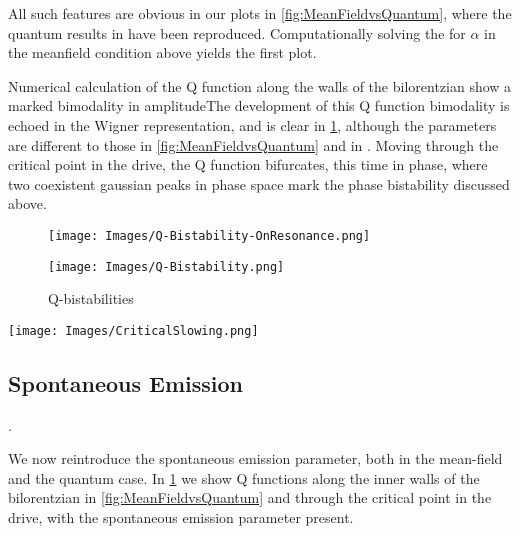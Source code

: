 All such features are obvious in our plots in \cref{fig:MeanFieldvsQuantum}, where the quantum results in \cite{Carmichael2015} have been reproduced. Computationally solving the for $\alpha$ in the meanfield condition above yields the first plot.

Numerical calculation of the Q function along the walls of the bilorentzian show a marked bimodality in amplitudeThe development of this Q function bimodality is echoed in the Wigner representation, and is clear in \cref{fig:Qbistabilities}, although the parameters are different to those in \cref{fig:MeanFieldvsQuantum} and in \cite{Carmichael2015}. Moving through the critical point in the drive, the Q function bifurcates, this time in phase, where two coexistent gaussian peaks in phase space mark the phase bistability discussed above.
\begin{figure}
 \begin{minipage}{.5\linewidth}
  \centering
  \texttt{[image: Images/Q-Bistability-OnResonance.png]}
  \caption{Development of phase bistability in the W function for fixed detuning, with drive moving through the critical point at $\frac{\Epsilon}{2}$}
  \end{minipage}%
  \begin{minipage}{.5\linewidth}
      \centering
      \texttt{[image: Images/Q-Bistability.png]}
      \caption{W functions with changing detuning and fixed drive. Note the probability fringes to the right connecting the peaks by spontaneous emission}
  \end{minipage}
  \caption{Q-bistabilities}\label{fig:Qbistabilities}
\end{figure}

\begin{figure*}
  \texttt{[image: Images/CriticalSlowing.png]}
  \caption{Time Dependent Solutions with g=0.5, $\kappa$ = 0.01, blue line is (0.24, 1), red line is (0.1, 1)}\label{fig:CriticalSlowing}
\end{figure*}

\subsection{Spontaneous Emission}.

We now reintroduce the spontaneous emission parameter, both in the mean-field and the quantum case. In \ref{fig:Qbistabilities} we show Q functions along the inner walls of the bilorentzian in \ref{fig:MeanFieldvsQuantum} and through the critical point in the drive, with the spontaneous emission parameter present.


